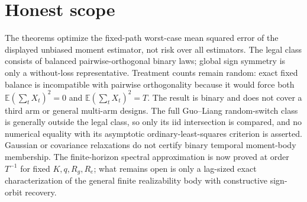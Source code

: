 \documentclass{article}
\begin{document}
\section{Honest scope}

The theorems optimize the fixed-path worst-case mean squared error of the displayed unbiased moment estimator, not risk over all estimators. The legal class consists of balanced pairwise-orthogonal binary laws; global sign symmetry is only a without-loss representative. Treatment counts remain random: exact fixed balance is incompatible with pairwise orthogonality because it would force both \(\mathbb E(\sum_tX_t)^2=0\) and \(\mathbb E(\sum_tX_t)^2=T\). The result is binary and does not cover a third arm or general multi-arm designs. The full Guo--Liang random-switch class is generally outside the legal class, so only its iid intersection is compared, and no numerical equality with its asymptotic ordinary-least-squares criterion is asserted. Gaussian or covariance relaxations do not certify binary temporal moment-body membership. The finite-horizon spectral approximation is now proved at order \(T^{-1}\) for fixed \(K,q,R_g,R_e\); what remains open is only a lag-sized exact characterization of the general finite realizability body with constructive sign-orbit recovery.
\end{document}
